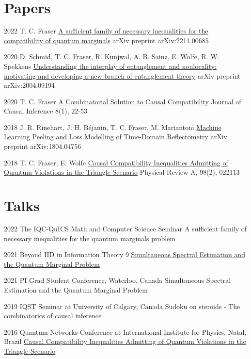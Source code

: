 \documentclass[10pt]{article}
\begin{document}
    \section{Papers}
    \begin{paperlist}
        \item{2022}
        {T. C. Fraser}
        {\href{https://arxiv.org/abs/2211.00685}{A sufficient family of necessary inequalities for the compatibility of quantum marginals}}
        {arXiv preprint arXiv:2211.00685}
        \item{2020}
        {D. Schmid, T. C. Fraser, R. Kunjwal, A. B. Sainz, E. Wolfe, R. W. Spekkens}
        {\href{https://arxiv.org/abs/2004.09194}{Understanding the interplay of entanglement and nonlocality: motivating and developing a new branch of entanglement theory}}
        {arXiv preprint arXiv:2004.09194}
        \item{2020}
        {T. C. Fraser}
        {\href{https://www.degruyter.com/document/doi/10.1515/jci-2019-0013/html?lang=en}{A Combinatorial Solution to Causal Compatibility}}
        {Journal of Causal Inference 8(1), 22-53}
        \item{2018}
        {J. R. Rinehart, J. H. Béjanin, T. C. Fraser, M. Mariantoni}
        {\href{https://arxiv.org/abs/1804.04756}{Machine Learning Peeling and Loss Modelling of Time-Domain Reflectometry}}
        {arXiv preprint arXiv:1804.04756}
        \item{2018}
        {T. C. Fraser, E. Wolfe}
        {\href{https://journals.aps.org/pra/abstract/10.1103/PhysRevA.98.022113}{Causal Compatibility Inequalities Admitting of Quantum Violations in the Triangle Scenario}}
        {Physical Review A, 98(2), 022113}
    \end{paperlist}
    \clearpage
    \section{Talks}
    \begin{academiclist}
        \item{2022}
        {The IQC-QuICS Math and Computer Science Seminar}
        {A sufficient family of necessary inequalities for the quantum marginals problem}
        \item{2021}
        {Beyond IID in Information Theory 9}
        {\href{https://www.youtube.com/watch?v=CTOC6l40G-c}{Simultaneous Spectral Estimation and the Quantum Marginal Problem}}
        \item{2021}
        {PI Grad Student Conference, Waterloo, Canada}
        {Simultaneous Spectral Estimation and the Quantum Marginal Problem}
        \item{2019}
        {IQST Seminar at University of Calgary, Canada}
        {Sudoku on steroids - The combinatorics of causal inference}
        \item{2016}
        {Quantum Networks Conference at International Institute for Physics, Natal, Brazil}
        {\href{https://github.com/tcfraser/tcfraser.github.io/raw/master/documents/quantum_networks_brazil_2016.pdf}{Causal Compatibility Inequalities Admitting of Quantum Violations in the Triangle Scenario}}
    \end{academiclist}
\end{document}
